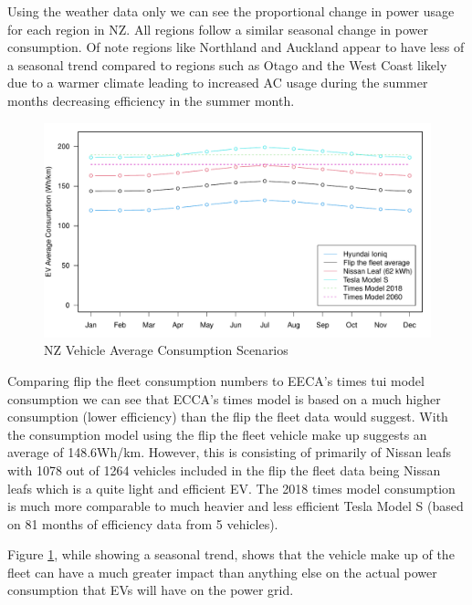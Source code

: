 \documentclass[
]{article}
\begin{document}
Using the weather data only we can see the proportional change in power
usage for each region in NZ. All regions follow a similar seasonal
change in power consumption. Of note regions like Northland and Auckland
appear to have less of a seasonal trend compared to regions such as
Otago and the West Coast likely due to a warmer climate leading to
increased AC usage during the summer months decreasing efficiency in the
summer month.

\begin{figure}
\centering
\includegraphics{summary_week4_files/figure-latex/vehicle_consum-1.pdf}
\caption{NZ Vehicle Average Consumption
Scenarios\label{fig:vehicle_consum}}
\end{figure}

Comparing flip the fleet consumption numbers to EECA's times tui model
\cite{times_model} consumption we can see that ECCA's times model is
based on a much higher consumption (lower efficiency) than the flip the
fleet data would suggest. With the consumption model using the flip the
fleet vehicle make up suggests an average of 148.6Wh/km. However, this
is consisting of primarily of Nissan leafs with 1078 out of 1264
vehicles included in the flip the fleet data being Nissan leafs which is
a quite light and efficient EV. The 2018 times model consumption is much
more comparable to much heavier and less efficient Tesla Model S (based
on 81 months of efficiency data from 5 vehicles).

Figure \ref{fig:vehicle_consum}, while showing a seasonal trend, shows
that the vehicle make up of the fleet can have a much greater impact
than anything else on the actual power consumption that EVs will have on
the power grid.
\end{document}
